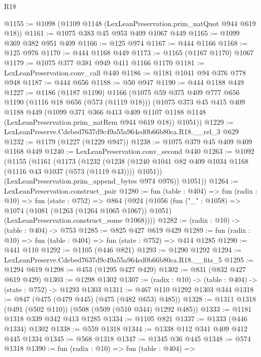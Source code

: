 \begin{lexlean}{R18}
\begin{coremodule}
@1155 := @1098 (@1109 @1148 (LexLeanPreservation.prim_natQuot @944 @619 @18))
@1161 := @1075 @383 @45 @953 @409 @1067 @449
@1165 := @1099 @369 @382 @951 @409
@1166 := @125 @974
@1167 := @444 @1166
@1168 := @125 @976
@1170 := @444 @1168 @449
@1173 := @1165 (@1167 @1170) @1067
@1179 := @1075 @377 @381 @949 @411 @1166 @1170
@1181 := LexLeanPreservation.conv_call @440
@1186 := @1181 @1041 @94 @376 @778 @948
@1187 := @444 @656
@1188 := @50 @947
@1190 := @444 @1188 @449
@1227 := @1186
    (@1187 @1190)
    @1166
    (@1075
      @59
      @375
      @409
      @777
      @656
      @1190
      (@1116 @18 @656 (@573 (@1119 @18)))
      (@1075
        @373
        @45
        @415
        @409
        @1188
        @449
        (@1099
          @371
          @366
          @413
          @409
          @1107
          @1188
          @1148
          (LexLeanPreservation.prim_natRem @944 @619 @18))
        @1051))
@1229 := LexLeanPreserve.Cdebed7637d9c49a55a964ed0b66b80ca.R18.__rel_3 @629
@1232 := @1179 (@1227 (@1229 @947))
@1238 := @1075 @379 @45 @409 @409 @1168 @449
@1240 := LexLeanPreservation.conv_second @440
@1263 := @1092
    (@1155
      (@1161
        (@1173
          (@1232
            (@1238 (@1240 @1041 @82 @409 @1034 @1168 (@1116 @43 @1037 (@573 (@1119 @43)))) @1051))
          (LexLeanPreservation.prim_append_bytes @974 @976))
        @1051))
@1264 := LexLeanPreservation.construct_pair
@1280 := fun (table : @404) =>
  fun (radix : @10) =>
  fun (state : @752) =>
  @864
    (@924
      (@1056
        (fun ("_" : @1058) =>
        @1074
          (@1081 (@1263 (@1264 @1065 @1067)) @1051)
          (LexLeanPreservation.construct_some @1068))))
@1282 := (radix : @10) -> (table : @404) -> @753
@1285 := @825 @427 @619 @429
@1289 := fun (radix : @10) => fun (table : @404) => fun (state : @752) => @414 @1285
@1290 := @441 @110
@1292 := @1105 (@446 @821)
@1293 := @1290 @1292
@1294 := LexLeanPreserve.Cdebed7637d9c49a55a964ed0b66b80ca.R18.__fits_5
@1295 := @1294 @619
@1298 := @453 (@1295 @427 @429)
@1302 := @831 (@832 @427 @619 @429)
@1303 := @1298 @1302
@1307 := (radix : @10) -> (table : @404) -> (state : @752) -> @1293 @1303
@1311 := @467 @110 @1292 @1303 @344
@1318 := @847 (@475 (@479 @445) (@475 (@482 @653) @485))
@1328 := @1311 @1318 (@491 (@502 @110)) (@508 (@509 (@510 @344) @1292 @485))
@1333 := @1181 @1318 @339 @342 @413 @1285
@1334 := @1105 @821
@1337 := @1333 (@446 @1334) @1302
@1338 := @559 @1318
@1344 := @1338 @112 @341 @409 @412 @445 @1334
@1345 := @568 @1318
@1347 := @1345 @36 @445
@1348 := @574 @1318
@1390 := fun (radix : @10) =>
  fun (table : @404) =>

\end{coremodule}
\end{lexlean}

